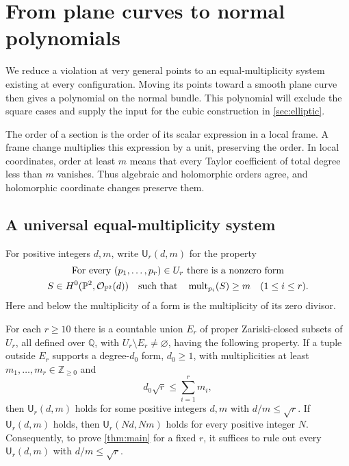 \section{From plane curves to normal polynomials}
\label{sec:reductions}

We reduce a violation at very general points to an equal-multiplicity system existing at every configuration.  Moving its points toward a smooth plane curve then gives a polynomial on the normal bundle. This polynomial will exclude the square cases and supply the input for the cubic construction in \cref{sec:elliptic}.

The order of a section is the order of its scalar expression in a local frame.  A frame change multiplies this expression by a unit, preserving the order.  In local coordinates, order at least $m$ means that every Taylor coefficient of total degree less than $m$ vanishes.  Thus algebraic and holomorphic orders agree, and holomorphic coordinate changes preserve them.

\subsection{A universal equal-multiplicity system}

For positive integers $d,m$, write $\mathsf U_r(d,m)$ for the property
\begin{equation}
\label{eq:universal}
\begin{gathered}
\text{For every }(p_1,\ldots,p_r)\in U_r\text{ there is a nonzero form}\\
S\in H^0(\mathbb{P}^2,\mathcal{O}_{\mathbb{P}^2}(d))
\quad\text{such that}\quad
\operatorname{mult}_{p_i}(S)\ge m\quad(1\le i\le r).
\end{gathered}
\end{equation}
Here and below the multiplicity of a form is the multiplicity of its zero divisor.

\begin{lemma}
\label{lem:universal}
For each $r\ge10$ there is a countable union $E_r$ of proper Zariski-closed subsets of $U_r$, all defined over $\mathbb{Q}$, with $U_r\setminus E_r\ne\varnothing$, having the following property. If a tuple outside $E_r$ supports a degree-$d_0$ form, $d_0\ge1$, with multiplicities at least $m_1,\ldots,m_r\in\mathbb{Z}_{\ge0}$ and
\[
 d_0\sqrt r\le\sum_{i=1}^r m_i,
\]
then $\mathsf U_r(d,m)$ holds for some positive integers $d,m$ with $d/m\le\sqrt r$.  If $\mathsf U_r(d,m)$ holds, then $\mathsf U_r(Nd,Nm)$ holds for every positive integer $N$. Consequently, to prove \cref{thm:main} for a fixed $r$, it suffices to rule out every $\mathsf U_r(d,m)$ with $d/m\le\sqrt r$.
\end{lemma}

